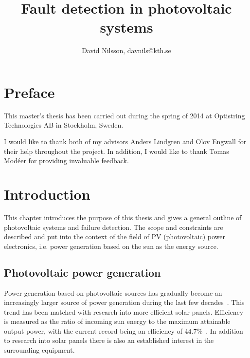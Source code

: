 


\title{Fault detection in photovoltaic systems}
\author{David Nilsson, davnils@kth.se}



\maketitle


\tableofcontents

\chapter*{Preface}
This master's thesis has been carried out during the spring of 2014 at Optistring Technologies AB in Stockholm, Sweden.

I would like to thank both of my advisors Anders Lindgren and Olov Engwall for their help throughout the project.
In addition, I would like to thank Tomas Modéer for providing invaluable feedback.

\printglossaries
\cleardoublepage
{}
\listoffigures
\clearpage
{}

\chapter{Introduction}
This chapter introduces the purpose of this thesis and gives a general outline of photovoltaic systems and failure detection.
The scope and constraints are described and put into the context of the field of PV (photovoltaic) power electronics, i.e. power generation based on the sun as the energy source.

\section{Photovoltaic power generation}
Power generation based on photovoltaic sources has gradually become an increasingly larger source of power generation during the last few decades~\cite{Zhao2010thesis}.
This trend has been matched with research into more efficient solar panels.
Efficiency is measured as the ratio of incoming sun energy to the maximum attainable output power, with the current record being an efficiency of $44.7\%$~\cite{Fraunhofer2013}.
In addition to research into solar panels there is also an established interest in the surrounding equipment.

